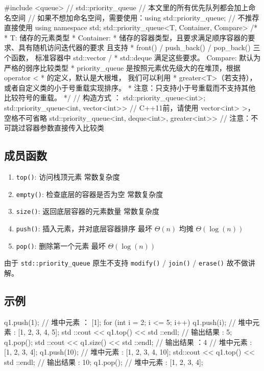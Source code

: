 
\begin{cppcode}
#include <queue>  // std::priority_queue
// 本文里的所有优先队列都会加上命名空间
// 如果不想加命名空间，需要使用：using std::priority_queue;
// 不推荐直接使用 using namespace std;
std::priority_queue<T, Container, Compare>
    /*
     * T: 储存的元素类型
     * Container:
     * 储存的容器类型，且要求满足顺序容器的要求、具有随机访问迭代器的要求 且支持
     * front() / push_back() / pop_back() 三个函数， 标准容器中 std::vector /
     * std::deque 满足这些要求。 Compare: 默认为严格的弱序比较类型
     * priority_queue 是按照元素优先级大的在堆顶，根据 operator <
     * 的定义，默认是大根堆， 我们可以利用
     * greater<T>（若支持），或者自定义类的小于号重载实现排序。
     * 注意：只支持小于号重载而不支持其他比较符号的重载。
     */
    // 构造方式 ：
    std::priority_queue<int>;
std::priority_queue<int, vector<int>>
    // C++11前，请使用 vector<int> >，空格不可省略
    std::priority_queue<int, deque<int>, greater<int>>
    // 注意：不可跳过容器参数直接传入比较类
\end{cppcode}

\subsection{成员函数}

\begin{enumerate}
\item \texttt{top()}: 访问栈顶元素 常数复杂度
\item \texttt{empty()}: 检查底层的容器是否为空 常数复杂度
\item \texttt{size()}: 返回底层容器的元素数量 常数复杂度
\item \texttt{push()}: 插入元素，并对底层容器排序 最坏 $\Theta(n)$ 均摊 $\Theta(\log(n))$
\item \texttt{pop()}: 删除第一个元素 最坏 $\Theta(\log(n))$
\end{enumerate}

由于 \texttt{std::priority\_queue} 原生不支持 \texttt{modify()} / \texttt{join()} / \texttt{erase()} 故不做讲解。

\subsection{示例}

\begin{cppcode}
q1.push(1);
// 堆中元素 ： [1];
for (int i = 2; i <= 5; i++) q1.push(i);
// 堆中元素 :  [1, 2, 3, 4, 5];
std ::cout << q1.top() << std ::endl;
// 输出结果 : 5;
q1.pop();
std ::cout << q1.size() << std ::endl;
// 输出结果 ：4
// 堆中元素 : [1, 2, 3, 4];
q1.push(10);
// 堆中元素 : [1, 2, 3, 4, 10];
std::cout << q1.top() << std ::endl;
// 输出结果 : 10;
q1.pop();
// 堆中元素 : [1, 2, 3, 4];
\end{cppcode}
